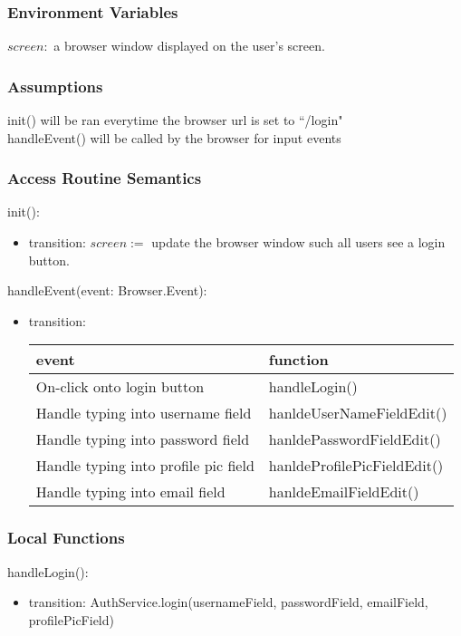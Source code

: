 \documentclass[12pt, titlepage]{article}
\begin{document}
\subsubsection{Environment Variables}
$screen: $ a browser window displayed on the user's screen.

\subsubsection{Assumptions}

init() will be ran everytime the browser url is set to ``/login"\\
handleEvent() will be called by the browser for input events

\subsubsection{Access Routine Semantics}
\noindent init():
\begin{itemize}
\item transition: $screen := $ update the browser window such all users see a login button.
\end{itemize}

\noindent handleEvent(event: Browser.Event):
\begin{itemize}
\item transition: \begin{tabular}{p{5cm} p{4cm}}
\hline
\textbf{event} & \textbf{function} \\
\hline
On-click onto login button & handleLogin() \\
Handle typing into username field  & hanldeUserNameFieldEdit() \\
Handle typing into password field & hanldePasswordFieldEdit() \\
Handle typing into profile pic field & hanldeProfilePicFieldEdit() \\
Handle typing into email field & hanldeEmailFieldEdit() \\
\hline
\end{tabular}
    
\end{itemize}

\subsubsection{Local Functions}

\noindent handleLogin():
\begin{itemize}
\item transition: AuthService.login(usernameField, passwordField, emailField, profilePicField)
\end{itemize}
\end{document}
